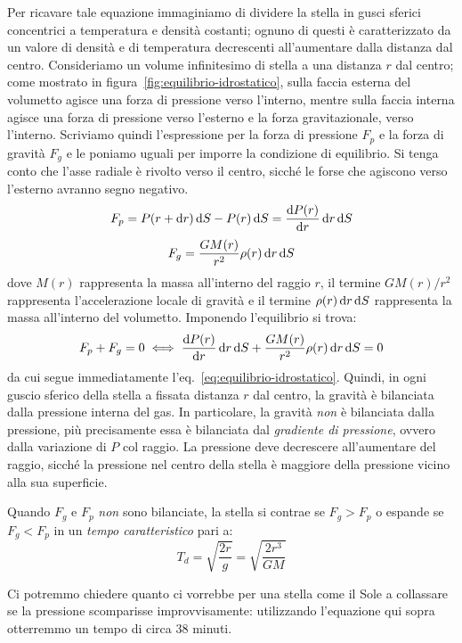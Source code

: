 Per ricavare tale equazione immaginiamo di dividere la stella in gusci sferici concentrici a temperatura e densità costanti; ognuno di questi è caratterizzato da un valore di densità e di temperatura decrescenti all'aumentare dalla distanza dal centro. Consideriamo un volume infinitesimo di stella a una distanza $r$ dal centro; come mostrato in figura~\ref{fig:equilibrio-idrostatico}, sulla faccia esterna del volumetto agisce una forza di pressione verso l'interno, mentre sulla faccia interna agisce una forza di pressione verso l'esterno e la forza gravitazionale, verso l'interno. Scriviamo quindi l'espressione per la forza di pressione $F_p$ e la forza di gravità $F_g$ e le poniamo uguali per imporre la condizione di equilibrio. Si tenga conto che l'asse radiale è rivolto verso il centro, sicché le forse che agiscono verso l'esterno avranno segno negativo.
\[
    F_p = P(r+\mathop{\mathrm{{}d}}\mathopen{} r) \mathop{\mathrm{{}d}}\mathopen{} S - P(r) \mathop{\mathrm{{}d}}\mathopen{} S = \frac{\mathop{\mathrm{{}d}}\mathopen{} P(r)}{\mathop{\mathrm{{}d}}\mathopen{} r} \mathop{\mathrm{{}d}}\mathopen{} r \mathop{\mathrm{{}d}}\mathopen{} S
\]
\[
    F_g = \frac{GM(r)}{r^2} \rho(r) \mathop{\mathrm{{}d}}\mathopen{} r \mathop{\mathrm{{}d}}\mathopen{} S
\]
dove $M(r)$ rappresenta la massa all'interno del raggio $r$, il termine $GM(r) / r^2$ rappresenta l'accelerazione locale di gravità e il termine $\rho(r) \mathop{\mathrm{{}d}}\mathopen{} r \mathop{\mathrm{{}d}}\mathopen{} S$ rappresenta la massa all'interno del volumetto. Imponendo l'equilibrio si trova:
\[
    F_p + F_g = 0 \iff \frac{\mathop{\mathrm{{}d}}\mathopen{} P(r)}{\mathop{\mathrm{{}d}}\mathopen{} r} \mathop{\mathrm{{}d}}\mathopen{} r \mathop{\mathrm{{}d}}\mathopen{} S+ \frac{GM(r)}{r^2} \rho(r) \mathop{\mathrm{{}d}}\mathopen{} r \mathop{\mathrm{{}d}}\mathopen{} S = 0
\]
da cui segue immediatamente l'eq.~\eqref{eq:equilibrio-idrostatico}. Quindi, in ogni guscio sferico della stella a fissata distanza $r$ dal centro, la gravità è bilanciata dalla pressione interna del gas. In particolare, la gravità \emph{non} è bilanciata dalla pressione, più precisamente essa è bilanciata dal \emph{gradiente di pressione}, ovvero dalla variazione di $P$ col raggio. La pressione deve decrescere all'aumentare del raggio, sicché la pressione nel centro della stella è maggiore della pressione vicino alla sua superficie. 

Quando $F_g$ e $F_p$ \emph{non} sono bilanciate, la stella si contrae se $F_g > F_p$ o espande se $F_g < F_p$ in un \emph{tempo caratteristico} pari a:
\[
    T_d = \sqrt{\frac{2r}{g}} = \sqrt{\frac{2r^3}{GM}}
\]

Ci potremmo chiedere quanto ci vorrebbe per una stella come il Sole a collassare se la pressione scomparisse improvvisamente: utilizzando l'equazione qui sopra otterremmo un tempo di circa 38 minuti.